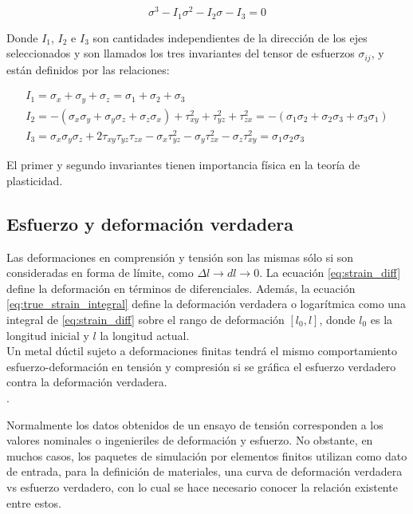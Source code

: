 \begin{equation}
\sigma^3 - I_1 \sigma^2 - I_2 \sigma - I_3 = 0
\end{equation}

Donde $I_1$, $I_2$ e $I_3$ son cantidades independientes de la dirección de los ejes 
seleccionados y son llamados los tres invariantes del tensor de esfuerzos $\sigma_{ij}$, y están definidos 
por las relaciones:

\begin{align}
I_1 = \sigma_x + \sigma_y + \sigma_z = \sigma_1 + \sigma_2 + \sigma_3 \\
I_2 = -\left( \sigma_x \sigma_y + \sigma_y \sigma_z + \sigma_z \sigma_x \right) + \tau_{xy}^2 + 
\tau_{yz}^2 + \tau_{zx}^2 = -(\sigma_1 \sigma_2 + \sigma_2 \sigma_3 + \sigma_3 \sigma_1) \\
I_3 = \sigma_x \sigma_y \sigma_z + 2 \tau_{xy} \tau_{yz} \tau_{zx} - \sigma_x \tau_{yz}^2 - \sigma_y \tau_{zx}^2 - 
\sigma_z \tau_{xy}^2 = \sigma_1 \sigma_2 \sigma_3
\end{align}

El primer y segundo invariantes tienen importancia física en la teoría de plasticidad.\\


\subsection{Esfuerzo y deformación verdadera} \label{subsec:true_strain_stress}

Las deformaciones en comprensión y tensión son las mismas sólo si son consideradas 
en forma de límite, como $\Delta l \to dl  \to 0$. La ecuación \ref{eq:strain_diff} 
define la deformación en términos de diferenciales. Además, la ecuación 
\ref{eq:true_strain_integral} define la deformación verdadera o logarítmica como una integral 
de \ref{eq:strain_diff} sobre el rango de deformación $[l_0, l]$, donde 
$l_0$ es la longitud inicial y $l$ la longitud actual.\\

Un metal dúctil sujeto a deformaciones finitas tendrá el mismo comportamiento esfuerzo-deformación 
en tensión y compresión si se gráfica el esfuerzo verdadero contra la deformación verdadera.
~\cite{abaqus-gs-manual} \\.

Normalmente los datos obtenidos de un ensayo de tensión corresponden a los valores nominales 
o ingenieriles de deformación y esfuerzo. No obstante, en muchos casos, los paquetes de simulación por 
elementos finitos utilizan como dato de entrada, para la definición de materiales, una curva de 
deformación verdadera vs esfuerzo verdadero, con lo cual se hace necesario conocer la 
relación existente entre estos.\\

